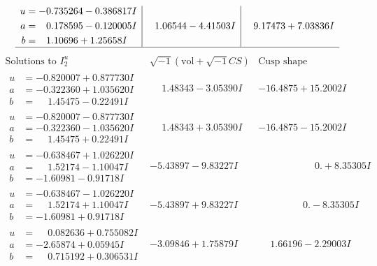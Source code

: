 \documentclass[1p]{elsarticle_modified}
\theoremstyle{definition}
\newcommand{\I}{\sqrt{-1}}
\begin{document}
$$\begin{array}{c|c|c}
\begin{aligned}
u &= -0.735264 - 0.386817 I \\
a &= \phantom{-}0.178595 - 0.120005 I \\
b &= \phantom{-}1.10696 + 1.25658 I\end{aligned}
 & \phantom{-}1.06544 - 4.41503 I & \phantom{-}9.17473 + 7.03836 I\\
 \hline 
 \end{array}$$\newpage$$\begin{array}{c|c|c}  
\text{Solutions to }I^u_{2}& \I (\text{vol} + \sqrt{-1}CS) & \text{Cusp shape}\\
 \hline 
\begin{aligned}
u &= -0.820007 + 0.877730 I \\
a &= -0.322360 + 1.035620 I \\
b &= \phantom{-}1.45475 - 0.22491 I\end{aligned}
 & \phantom{-}1.48343 - 3.05390 I & -16.4875 + 15.2002 I \\ \hline\begin{aligned}
u &= -0.820007 - 0.877730 I \\
a &= -0.322360 - 1.035620 I \\
b &= \phantom{-}1.45475 + 0.22491 I\end{aligned}
 & \phantom{-}1.48343 + 3.05390 I & -16.4875 - 15.2002 I \\ \hline\begin{aligned}
u &= -0.638467 + 1.026220 I \\
a &= \phantom{-}1.52174 - 1.10047 I \\
b &= -1.60981 - 0.91718 I\end{aligned}
 & -5.43897 - 9.83227 I & \phantom{-0.000000 -}0. + 8.35305 I \\ \hline\begin{aligned}
u &= -0.638467 - 1.026220 I \\
a &= \phantom{-}1.52174 + 1.10047 I \\
b &= -1.60981 + 0.91718 I\end{aligned}
 & -5.43897 + 9.83227 I & \phantom{-0.000000 } 0. - 8.35305 I \\ \hline\begin{aligned}
u &= \phantom{-}0.082636 + 0.755082 I \\
a &= -2.65874 + 0.05945 I \\
b &= \phantom{-}0.715192 + 0.306531 I\end{aligned}
 & -3.09846 + 1.75879 I & \phantom{-}1.66196 - 2.29003 I \\ \hline\begin{aligned}

\end{aligned}
\end{array}$$
\end{document}
